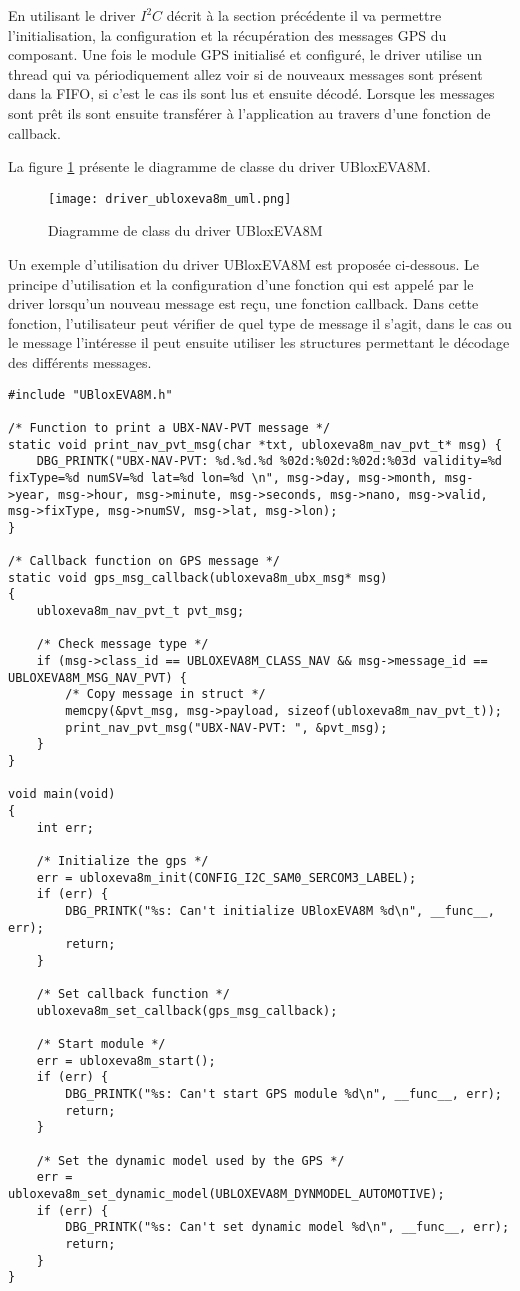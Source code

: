 En utilisant le driver $I^{2}C$ décrit à la section précédente il va permettre l'initialisation, la configuration et la récupération des messages GPS du composant. Une fois le module GPS initialisé et configuré, le driver utilise un thread qui va périodiquement allez voir si de nouveaux messages sont présent dans la FIFO, si c'est le cas ils sont lus et ensuite décodé. Lorsque les messages sont prêt ils sont ensuite transférer à l'application au travers d'une fonction de callback.

La figure \ref{fig:driver_ubloxeva8m_uml} présente le diagramme de classe du driver UBloxEVA8M.

\begin{figure}[htb]
\centering 
\texttt{[image: driver\_ubloxeva8m\_uml.png]} 
\caption{Diagramme de class du driver UBloxEVA8M}
\label{fig:driver_ubloxeva8m_uml}
\end{figure}

Un exemple d'utilisation du driver UBloxEVA8M est proposée ci-dessous. Le principe d'utilisation et la configuration d'une fonction qui est appelé par le driver lorsqu'un nouveau message est reçu, une fonction callback. Dans cette fonction, l'utilisateur peut vérifier de quel type de message il s'agit, dans le cas ou le message l'intéresse il peut ensuite utiliser les structures permettant le décodage des différents messages.

\begin{lstlisting}[style=CStyle]
#include "UBloxEVA8M.h"

/* Function to print a UBX-NAV-PVT message */
static void print_nav_pvt_msg(char *txt, ubloxeva8m_nav_pvt_t* msg) {
	DBG_PRINTK("UBX-NAV-PVT: %d.%d.%d %02d:%02d:%02d:%03d validity=%d fixType=%d numSV=%d lat=%d lon=%d \n", msg->day, msg->month, msg->year, msg->hour, msg->minute, msg->seconds, msg->nano, msg->valid, msg->fixType, msg->numSV, msg->lat, msg->lon);
}

/* Callback function on GPS message */
static void gps_msg_callback(ubloxeva8m_ubx_msg* msg)
{
	ubloxeva8m_nav_pvt_t pvt_msg;
	
	/* Check message type */
	if (msg->class_id == UBLOXEVA8M_CLASS_NAV && msg->message_id == UBLOXEVA8M_MSG_NAV_PVT) {
		/* Copy message in struct */
		memcpy(&pvt_msg, msg->payload, sizeof(ubloxeva8m_nav_pvt_t));
		print_nav_pvt_msg("UBX-NAV-PVT: ", &pvt_msg);
	}
}

void main(void)
{
	int err;

	/* Initialize the gps */
	err = ubloxeva8m_init(CONFIG_I2C_SAM0_SERCOM3_LABEL);
	if (err) {
		DBG_PRINTK("%s: Can't initialize UBloxEVA8M %d\n", __func__, err);
		return;
	}

	/* Set callback function */
	ubloxeva8m_set_callback(gps_msg_callback);

	/* Start module */
	err = ubloxeva8m_start();
	if (err) {
		DBG_PRINTK("%s: Can't start GPS module %d\n", __func__, err);
		return;
	}

	/* Set the dynamic model used by the GPS */
	err = ubloxeva8m_set_dynamic_model(UBLOXEVA8M_DYNMODEL_AUTOMOTIVE);
	if (err) {
		DBG_PRINTK("%s: Can't set dynamic model %d\n", __func__, err);
		return;
	}
}
\end{lstlisting}

